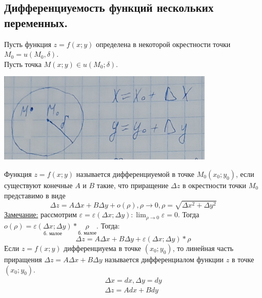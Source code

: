 \documentclass[12pt]{article}
\begin{document}
    \subsection{Дифференциуемость функций нескольких переменных.}\noindent
    Пусть функция $z = f(x;y)$ определена в некоторой окрестности точки $M_0 = u(M_0, \delta)$.\\
    Пусть точка $M (x; y) \in u(M_0; \delta)$.
    \begin{center}
        \includegraphics{7.5.1.png}
    \end{center}
    Функция $z = f(x;y)$ называется дифференциуемой в точке $M_0 (x_0; y_0)$, если существуют конечные $A$ и $B$ такие, что приращение $\Delta z$ в окрестности точки $M_0$ представимо в виде
    \[ \Delta z = A \Delta x + B \Delta y + o(\rho), \rho \to 0, \rho = \sqrt{\Delta x^2 + \Delta y^2} \]
    \underline{Замечание:} рассмотрим $\varepsilon = \varepsilon (\Delta x; \Delta y): \lim_{\rho \to 0}\varepsilon = 0$. Тогда $o(\rho) = \underset{\text{б. малое}}{\varepsilon(\Delta x; \Delta y)} * \underset{\text{б. малое}}{\rho}$. Тогда:
    \[ \Delta z = A \Delta x + B \Delta y + \varepsilon (\Delta x; \Delta y) * \rho \]
    Если $z = f(x; y)$ дифференциуема в точке $(x_0; y_0)$, то линейная часть приращения $\Delta z = A \Delta x + B \Delta y$ называется дифференциалом функции $z$ в точке $(x_0; y_0)$.
    \begin{gather*}
        \Delta x = dx, \Delta y = dy\\
        \Delta z = Adx + Bdy
    \end{gather*}
\end{document}
